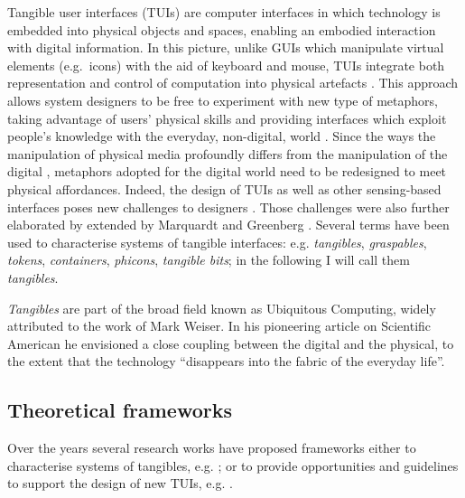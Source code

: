 Tangible user interfaces (TUIs) are computer interfaces in which technology is embedded into physical objects and spaces, enabling an embodied interaction with digital information. In this picture, unlike GUIs which manipulate virtual elements (e.g.~icons) with the aid of keyboard and mouse, TUIs integrate both representation and control of computation into physical artefacts \autocite{krumm2009ubiquitous}. This approach allows system designers to be free to experiment with new type of metaphors, taking advantage of users' physical skills and providing interfaces which exploit people's knowledge with the everyday, non-digital, world \autocite{Jacob:2008vm}. Since the ways the manipulation of physical media profoundly differs from the manipulation of the digital \autocite{Terrenghi:2007uv}, metaphors adopted for the digital world need to be redesigned to meet physical affordances. Indeed, the design of TUIs as well as other sensing-based interfaces poses new challenges to designers \autocite{Bellotti:2002wg}. Those challenges were also further elaborated by extended by Marquardt and Greenberg \autocite*{Marquardt:2012tg}. Several terms have been used to characterise systems of tangible interfaces: e.g. \emph{tangibles}, \emph{graspables}, \emph{tokens}, \emph{containers}, \emph{phicons}, \emph{tangible bits}; in the following I will call them \emph{tangibles}.

\emph{Tangibles} are part of the broad field known as Ubiquitous Computing, widely attributed to the work of Mark Weiser. In his pioneering article on Scientific American \autocite{weiser1991computer} he envisioned a close coupling between the digital and the physical, to the extent that the technology ``disappears into the fabric of the everyday life''.

\subsection{Theoretical frameworks}\label{frameworks}

Over the years several research works have proposed frameworks either to characterise systems of tangibles, e.g. \autocites{Fishkin:2004uv}{Jacob:2008vm}{Hornecker:2006uq}; or to provide opportunities and guidelines to support the design of new TUIs, e.g. \autocites{Benford:2005bo}{Shaer:2004ta}{Rogers:2006te}.

